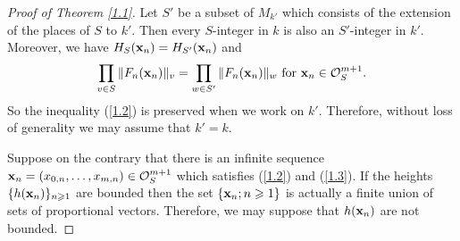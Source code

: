 \documentclass[12pt,leqno]{amsart}
\numberwithin{equation}{section}
\begin{document}
\begin{proof}[Proof of Theorem \ref{1.1}]
Let $S'$ be a subset of $M_{k'}$ which consists of the extension of the places of $S$ to $k'$. Then every $S$-integer in $k$ is also an $S'$-integer in $k'$. Moreover, we have $H_{S}({\bf x}_{n})=H_{S'}({\bf x}_{n})$ and
$$\prod_{v \in S}\|F_{n}({\bf x}_{n})\|_{v}=\prod_{w \in S'}\|F_{n}({\bf x}_{n})\|_{w} \text { for } {\bf x}_{n} \in \mathcal{O}_{S}^{m+1}.$$
So the inequality (\ref{1.2}) is preserved when we work on $k'$. Therefore, without loss of generality we may assume that $k'=k$. 

Suppose on the contrary that there is an infinite sequence ${\bf x}_{n}=(x_{0, n}, \ldots, x_{m,n}) \in \mathcal{O}_{S}^{m+1}$ which satisfies (\ref{1.2}) and (\ref{1.3}). If the heights $\{h({\bf x}_{n})\}_{n\geqslant 1}$ are bounded then the set $\{{\bf x}_{n};n\geqslant 1\}$ is actually a finite union of sets of proportional vectors. Therefore, we may suppose that $h({\bf x}_{n})$ are not bounded. 


\end{proof}
\end{document}
